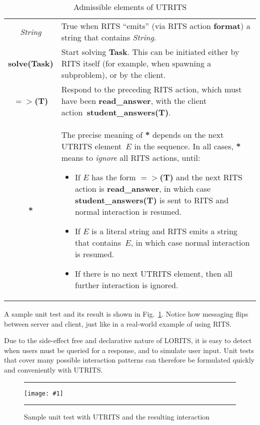 \documentclass[a4paper,11pt]{article}
\newcommand{\pslisting}[1]{\hrule\vskip0.2cm\texttt{[image: \#1]}\vskip0.2cm\hrule}
\begin{document}
\begin{table}[ht]
  \centering
  \begin{tabular}{cp{8.5cm}}
    \hline
    \textit{String} & True when RITS ``emits'' (via RITS action \textbf{format}) a string that contains \textit{String}. \\
    \textbf{solve(Task)} & Start solving \textbf{Task}. This can be initiated either by RITS itself (for example, when spawning a subproblem), or by the client.\\
    \textbf{$=>$(T)} & Respond to the preceding RITS action, which must have been \textbf{read\_answer}, with the client action~\textbf{student\_answers(T)}. \\
    \textbf{*} & The precise meaning of \textbf{*} depends on the next UTRITS element~$E$ in the sequence. In all cases, \textbf{*} means to \textit{ignore} all RITS actions, until:
    \begin{itemize}
    \item If $E$ has the form \textbf{$=>$(T)} and the next RITS action is \textbf{read\_answer}, in which case \textbf{student\_answers(T)} is sent to RITS and normal interaction is resumed.
    \item If $E$ is a literal string and RITS emits a string that contains~$E$, in which case normal interaction is resumed.
    \item If there is no next UTRITS element, then all further interaction is ignored.
    \end{itemize}\\
    \hline
  \end{tabular}
\caption{Admissible elements of UTRITS}
  \label{tab:utrits}
\end{table}

A sample unit test and its result is shown in Fig.~\ref{snip:utrits}.
Notice how messaging flips between server and client, just like in
a real-world example of using RITS.

Due to the side-effect free and declarative nature of LORITS, it is
easy to detect when users must be queried for a response, and to
simulate user input. Unit tests that cover many possible interaction
patterns can therefore be formulated quickly and conveniently with
UTRITS.


\begin{figure}[ht]
  \centering
  \pslisting{utrits.ps}
  \caption{Sample unit test with UTRITS and the resulting interaction}
  \label{snip:utrits}
\end{figure}

\vfil
\end{document}
